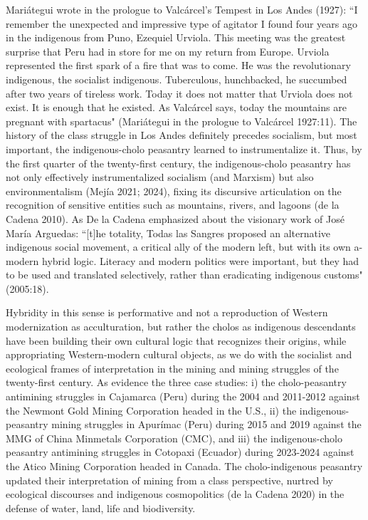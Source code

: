 \documentclass[]{interact}
\theoremstyle{plain}%
\theoremstyle{definition}
\theoremstyle{remark}
\begin{document}
Mariátegui wrote in the prologue to Valcárcel's Tempest in Los Andes (1927): “I remember the unexpected and impressive type of agitator I found four years ago in the indigenous from Puno, Ezequiel Urviola. This meeting was the greatest surprise that Peru had in store for me on my return from Europe. Urviola represented the first spark of a fire that was to come. He was the revolutionary indigenous, the socialist indigenous. Tuberculous, hunchbacked, he succumbed after two years of tireless work. Today it does not matter that Urviola does not exist. It is enough that he existed. As Valcárcel says, today the mountains are pregnant with spartacus" (Mariátegui in the prologue to Valcárcel 1927:11).
The history of the class struggle in Los Andes definitely precedes socialism, but most important, the indigenous-cholo peasantry learned to instrumentalize it. Thus, by the first quarter of the twenty-first century, the indigenous-cholo peasantry has not only effectively instrumentalized socialism (and Marxism) but also environmentalism (Mejía 2021; 2024), fixing its discursive articulation on the recognition of sensitive entities such as mountains, rivers, and lagoons (de la Cadena 2010). As De la Cadena emphasized about the visionary work of José María Arguedas: “[t]he totality, Todas las Sangres proposed an alternative indigenous social movement, a critical ally of the modern left, but with its own a-modern hybrid logic. Literacy and modern politics were important, but they had to be used and translated selectively, rather than eradicating indigenous customs" (2005:18). 

Hybridity in this sense is performative and not a reproduction of Western modernization as acculturation, but rather the cholos as indigenous descendants have been building their own cultural logic that recognizes their origins, while appropriating Western-modern cultural objects, as we do with the socialist and ecological frames of interpretation in the mining and mining struggles of the twenty-first century. As evidence the three case studies: i) the cholo-peasantry antimining struggles in Cajamarca (Peru) during the 2004 and 2011-2012 against the Newmont Gold Mining Corporation headed in the U.S., ii) the indigenous-peasantry mining struggles in Apurímac (Peru) during 2015 and 2019 against the MMG of China Minmetals Corporation (CMC), and iii) the indigenous-cholo peasantry antimining struggles in Cotopaxi (Ecuador) during 2023-2024 against the Atico Mining Corporation headed in Canada. The cholo-indigenous peasantry updated their interpretation of mining from a class perspective, nurtred by ecological discourses and indigenous cosmopolitics (de la Cadena 2020) in the defense of water, land, life and biodiversity. 
\end{document}
